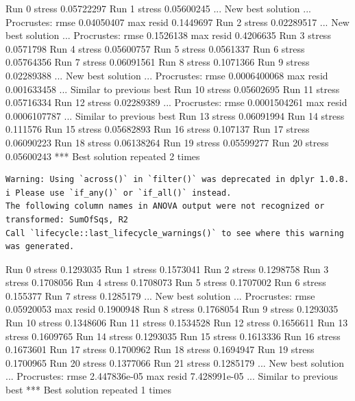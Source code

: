 \documentclass[
]{book}
\newenvironment{Shaded}{\begin{snugshade}}{\end{snugshade}}
\newcommand{\NormalTok}[1]{#1}
\begin{document}
\begin{Shaded}
\begin{Highlighting}[]
\NormalTok{Run 0 stress 0.05722297 }
\NormalTok{Run 1 stress 0.05600245 }
\NormalTok{... New best solution}
\NormalTok{... Procrustes: rmse 0.04050407  max resid 0.1449697 }
\NormalTok{Run 2 stress 0.02289517 }
\NormalTok{... New best solution}
\NormalTok{... Procrustes: rmse 0.1526138  max resid 0.4206635 }
\NormalTok{Run 3 stress 0.0571798 }
\NormalTok{Run 4 stress 0.05600757 }
\NormalTok{Run 5 stress 0.0561337 }
\NormalTok{Run 6 stress 0.05764356 }
\NormalTok{Run 7 stress 0.06091561 }
\NormalTok{Run 8 stress 0.1071366 }
\NormalTok{Run 9 stress 0.02289388 }
\NormalTok{... New best solution}
\NormalTok{... Procrustes: rmse 0.0006400068  max resid 0.001633458 }
\NormalTok{... Similar to previous best}
\NormalTok{Run 10 stress 0.05602695 }
\NormalTok{Run 11 stress 0.05716334 }
\NormalTok{Run 12 stress 0.02289389 }
\NormalTok{... Procrustes: rmse 0.0001504261  max resid 0.0006107787 }
\NormalTok{... Similar to previous best}
\NormalTok{Run 13 stress 0.06091994 }
\NormalTok{Run 14 stress 0.111576 }
\NormalTok{Run 15 stress 0.05682893 }
\NormalTok{Run 16 stress 0.107137 }
\NormalTok{Run 17 stress 0.06090223 }
\NormalTok{Run 18 stress 0.06138264 }
\NormalTok{Run 19 stress 0.05599277 }
\NormalTok{Run 20 stress 0.05600243 }
\NormalTok{*** Best solution repeated 2 times}
\end{Highlighting}
\end{Shaded}

\begin{verbatim}
Warning: Using `across()` in `filter()` was deprecated in dplyr 1.0.8.
i Please use `if_any()` or `if_all()` instead.
The following column names in ANOVA output were not recognized or transformed: SumOfSqs, R2
Call `lifecycle::last_lifecycle_warnings()` to see where this warning was generated.
\end{verbatim}

\begin{Shaded}
\begin{Highlighting}[]
\NormalTok{Run 0 stress 0.1293035 }
\NormalTok{Run 1 stress 0.1573041 }
\NormalTok{Run 2 stress 0.1298758 }
\NormalTok{Run 3 stress 0.1708056 }
\NormalTok{Run 4 stress 0.1708073 }
\NormalTok{Run 5 stress 0.1707002 }
\NormalTok{Run 6 stress 0.155377 }
\NormalTok{Run 7 stress 0.1285179 }
\NormalTok{... New best solution}
\NormalTok{... Procrustes: rmse 0.05920053  max resid 0.1900948 }
\NormalTok{Run 8 stress 0.1768054 }
\NormalTok{Run 9 stress 0.1293035 }
\NormalTok{Run 10 stress 0.1348606 }
\NormalTok{Run 11 stress 0.1534528 }
\NormalTok{Run 12 stress 0.1656611 }
\NormalTok{Run 13 stress 0.1609765 }
\NormalTok{Run 14 stress 0.1293035 }
\NormalTok{Run 15 stress 0.1613336 }
\NormalTok{Run 16 stress 0.1673601 }
\NormalTok{Run 17 stress 0.1700962 }
\NormalTok{Run 18 stress 0.1694947 }
\NormalTok{Run 19 stress 0.1700965 }
\NormalTok{Run 20 stress 0.1377066 }
\NormalTok{Run 21 stress 0.1285179 }
\NormalTok{... New best solution}
\NormalTok{... Procrustes: rmse 2.447836e{-}05  max resid 7.428991e{-}05 }
\NormalTok{... Similar to previous best}
\NormalTok{*** Best solution repeated 1 times}
\end{Highlighting}
\end{Shaded}
\end{document}
